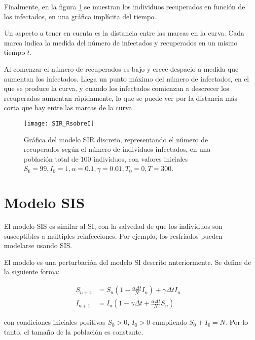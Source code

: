 Finalmente, en la figura \ref{fig: SIR_RsobreI} se muestran los individuos recuperados en función de los infectados, en una gráfica implícita del tiempo.

Un aspecto a tener en cuenta es la distancia entre las marcas en la curva. Cada marca indica la medida del número de infectados y recuperados en un mismo tiempo $t$.

Al comenzar el número de recuperados es bajo y crece despacio a medida que aumentan los infectados. Llega un punto máximo del número de infectados, en el que se produce la curva, y cuando los infectados comienzan a descrecer los recuperados aumentan rápidamente, lo que se puede ver por la distancia más corta que hay entre las marcas de la curva.

\begin{figure}
\begin{center}

\caption{Gráfica del modelo SIR discreto, representando el número de recuperados según el número de individuos infectados, en una población total de $100$ individuos, con valores iniciales $S_0=99, I_0 = 1, \alpha = 0.1, \gamma=0.01, T_0 = 0, T = 300$.}
\label{fig: SIR_RsobreI}
\texttt{[image: SIR\_RsobreI]}
\end{center}
\end{figure}

\section{Modelo SIS}
El modelo SIS es similar al SI, con la salvedad de que los individuos son susceptibles a múltiples reinfecciones.
Por ejemplo, los resfriados pueden modelarse usando SIS.

El modelo es una perturbación del modelo SI descrito anteriormente. Se define de la siguiente forma:

\begin{equation}
\label{eqn: modelo_SIS}
\begin{aligned}
S_{n+1} & = S_n \left(1-\frac{\alpha\Delta t}{N} I_n \right) + \gamma \Delta t I_n \\
I_{n+1} & = I_n \left( 1-\gamma \Delta t + \frac{\alpha\Delta t}{N} S_n \right)
\end{aligned}
\end{equation}

con condiciones iniciales positivas $S_0>0$, $I_0>0$ cumpliendo $S_0+I_0=N$. Por lo tanto, el tamaño de la población es constante.

